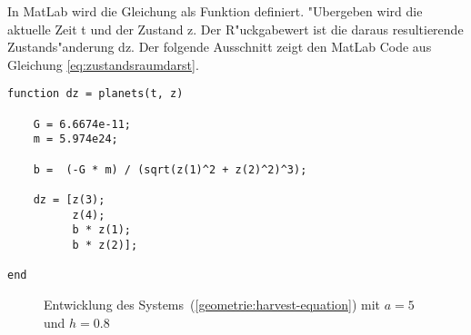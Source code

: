 \begin{refsection}
In MatLab wird die Gleichung als Funktion definiert.
"Ubergeben wird die aktuelle Zeit t und der Zustand z.
Der R"uckgabewert ist die daraus resultierende  Zustands"anderung dz.
Der folgende Ausschnitt zeigt den MatLab Code aus Gleichung \ref{eq:zustandsraumdarst}.

\begin{lstlisting}[style=Matlab]
function dz = planets(t, z)

    G = 6.6674e-11;
    m = 5.974e24;

    b =  (-G * m) / (sqrt(z(1)^2 + z(2)^2)^3);
    
    dz = [z(3);
          z(4);
          b * z(1);
          b * z(2)];
      
end
\end{lstlisting}

\begin{figure}
\centering
\caption{Entwicklung des Systems~(\ref{geometrie:harvest-equation})
mit $a=5$ und $h=0.8$
\label{geometrie:harvest-graph}}
\end{figure}%

\end{refsection}

